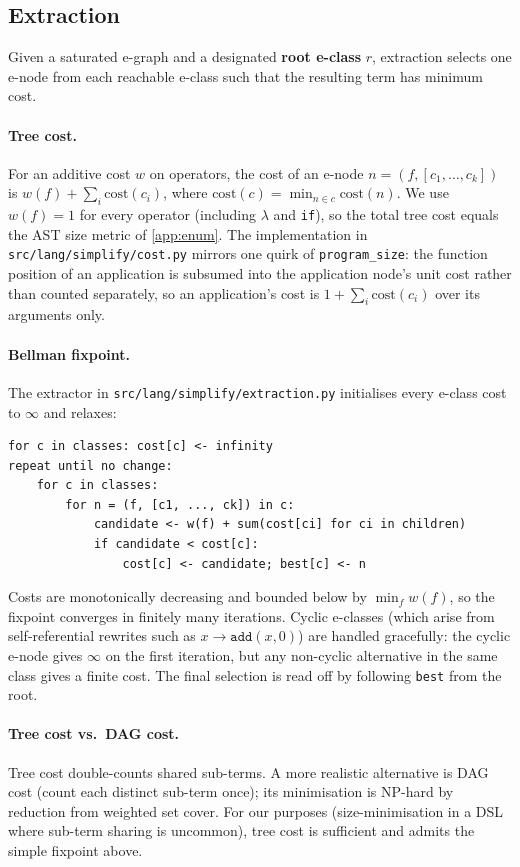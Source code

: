 \documentclass[12pt]{article}
\begin{document}
\subsection{Extraction}\label{app:extraction}

Given a saturated e-graph and a designated \textbf{root e-class} $r$, extraction selects one e-node from each reachable e-class such that the resulting term has minimum cost.

\paragraph{Tree cost.} For an additive cost $w$ on operators, the cost of an e-node $n = (f, [c_1, \ldots, c_k])$ is $w(f) + \sum_i \mathrm{cost}(c_i)$, where $\mathrm{cost}(c) = \min_{n \in c} \mathrm{cost}(n)$. We use $w(f) = 1$ for every operator (including $\lambda$ and \texttt{if}), so the total tree cost equals the AST size metric of \cref{app:enum}. The implementation in \texttt{src/lang/simplify/cost.py} mirrors one quirk of \texttt{program\_size}: the function position of an application is subsumed into the application node's unit cost rather than counted separately, so an application's cost is $1 + \sum_i \mathrm{cost}(c_i)$ over its arguments only.

\paragraph{Bellman fixpoint.} The extractor in \texttt{src/lang/simplify/extraction.py} initialises every e-class cost to $\infty$ and relaxes:
\begin{lstlisting}
for c in classes: cost[c] <- infinity
repeat until no change:
    for c in classes:
        for n = (f, [c1, ..., ck]) in c:
            candidate <- w(f) + sum(cost[ci] for ci in children)
            if candidate < cost[c]:
                cost[c] <- candidate; best[c] <- n
\end{lstlisting}
Costs are monotonically decreasing and bounded below by $\min_f w(f)$, so the fixpoint converges in finitely many iterations. Cyclic e-classes (which arise from self-referential rewrites such as $x \to \mathtt{add}(x, 0)$) are handled gracefully: the cyclic e-node gives $\infty$ on the first iteration, but any non-cyclic alternative in the same class gives a finite cost. The final selection is read off by following \texttt{best} from the root.

\paragraph{Tree cost vs.\ DAG cost.} Tree cost double-counts shared sub-terms. A more realistic alternative is DAG cost (count each distinct sub-term once); its minimisation is NP-hard by reduction from weighted set cover. For our purposes (size-minimisation in a DSL where sub-term sharing is uncommon), tree cost is sufficient and admits the simple fixpoint above.
\end{document}
